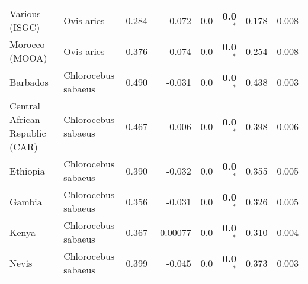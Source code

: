 \begin{center}
\begin{adjustbox}{width = 1\textwidth}
\begin{tabular}{|l|l|r|r|r|r|r|r|}
                 Various (ISGC) &           Ovis aries &                                              0.284 &                                              0.072 &              0.0 &                    \textbf{0.0}$\bm{^*}$ &                                              0.178 &              0.008 \\
                 Morocco (MOOA) &           Ovis aries &                                              0.376 &                                              0.074 &              0.0 &                    \textbf{0.0}$\bm{^*}$ &                                              0.254 &              0.008 \\
                       Barbados &  Chlorocebus sabaeus &                                              0.490 &                                             -0.031 &              0.0 &                    \textbf{0.0}$\bm{^*}$ &                                              0.438 &              0.003 \\
 Central African Republic (CAR) &  Chlorocebus sabaeus &                                              0.467 &                                             -0.006 &              0.0 &                    \textbf{0.0}$\bm{^*}$ &                                              0.398 &              0.006 \\
                       Ethiopia &  Chlorocebus sabaeus &                                              0.390 &                                             -0.032 &              0.0 &                    \textbf{0.0}$\bm{^*}$ &                                              0.355 &              0.005 \\
                         Gambia &  Chlorocebus sabaeus &                                              0.356 &                                             -0.031 &              0.0 &                    \textbf{0.0}$\bm{^*}$ &                                              0.326 &              0.005 \\
                          Kenya &  Chlorocebus sabaeus &                                              0.367 &                                           -0.00077 &              0.0 &                    \textbf{0.0}$\bm{^*}$ &                                              0.310 &              0.004 \\
                          Nevis &  Chlorocebus sabaeus &                                              0.399 &                                             -0.045 &              0.0 &                    \textbf{0.0}$\bm{^*}$ &                                              0.373 &              0.003 \\

\end{tabular}
\end{adjustbox}
\end{center}
